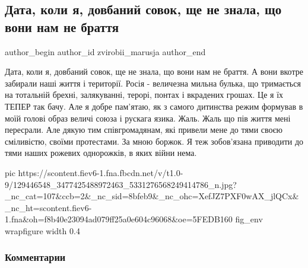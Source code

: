  
 
 
 
 
 
\subsection{Дата, коли я, довбаний совок, ще не знала, що вони нам не браття}
\label{sec:03_12_2020.fb.zvirobii_marusja.1.dovbanyy_sovok}
\ifcmt
	author_begin
   author_id zvirobii_marusja
	author_end
\fi

Дата, коли я, довбаний совок, ще не знала, що вони нам не браття. А вони вкотре
забирали наші життя і території. Росія - величезна мильна булька, що тримається
на тотальній брехні, залякуванні, терорі, понтах і вкрадених грошах. Це я їх
ТЕПЕР так бачу. Але я добре пам'ятаю, як з самого дитинства режим формував в
моїй голові образ величі союза і рускага язика. Жаль. Жаль що пів життя мені
пересрали. Але дякую тим співгромадянам, які привели мене до тями своєю
сміливістю, своїми протестами. За мною боржок. Я теж зобов'язана приводити до
тями наших рожевих однорожків, в яких війни нема.

\ifcmt
pic https://scontent.fiev6-1.fna.fbcdn.net/v/t1.0-9/129446548_3477425488972463_5331276568249414786_n.jpg?_nc_cat=107&ccb=2&_nc_sid=8bfeb9&_nc_ohc=XefJZ7PXF0wAX_jlQCx&_nc_ht=scontent.fiev6-1.fna&oh=f8b40e23094ad079ff25a0e604c96068&oe=5FEDB160
fig_env wrapfigure
width 0.4
\fi

\subsubsection{Комментарии}

